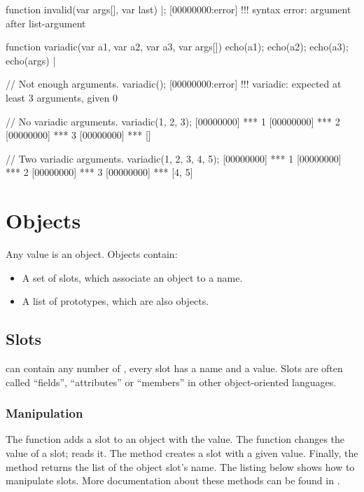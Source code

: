 \begin{comment}
\begin{urbiscript}
removeSlot("variadic")|;
\end{urbiscript}
\end{comment}

\begin{urbiscript}
function invalid(var args[], var last)
{} |;
[00000000:error] !!! syntax error: argument after list-argument

function variadic(var a1, var a2, var a3, var args[])
{
  echo(a1);
  echo(a2);
  echo(a3);
  echo(args)
} |

// Not enough arguments.
variadic();
[00000000:error] !!! variadic: expected at least 3 arguments, given 0

// No variadic arguments.
variadic(1, 2, 3);
[00000000] *** 1
[00000000] *** 2
[00000000] *** 3
[00000000] *** []

// Two variadic arguments.
variadic(1, 2, 3, 4, 5);
[00000000] *** 1
[00000000] *** 2
[00000000] *** 3
[00000000] *** [4, 5]
\end{urbiscript}



\section{Objects}

Any \us value is an object. Objects contain:

\begin{itemize}
\item A set of slots, which associate an object to a name.
\item A list of prototypes, which are also objects.
\end{itemize}

\subsection{Slots}

 can contain any number of , every slot has a name
and a value. Slots are often called ``fields'', ``attributes'' or
``members'' in other object-oriented languages.

\subsubsection{Manipulation}

The  function adds a slot to an object with the
 value. The  function changes
the value of a slot;  reads it. The
 method creates a slot with a given value. Finally,
the  method returns the list of the object
slot's name. The listing below shows how to manipulate slots. More
documentation about these methods can be found in .

